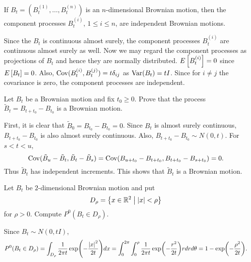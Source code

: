 \begin{exercise}{2.11}\label{ex:2.11}
    If $B_t = (B_t^{(1)},\ldots,B_t^{(n)})$ is an $n$-dimensional Brownian motion, 
    then the component processes $B_t^{(i)}$, $1\leq i\leq n$, are 
    independent Brownian motions. 
\end{exercise}
\begin{solution}
    Since the $B_t$ is continuous almost surely, the component processes 
    $B_t^{(i)}$ are continuous almost surely as well. Now we may regard 
    the component processes as projections of $B_t$ and hence they are 
    normally distributed. $E\left[ {B_t^{(i)}} \right] = 0$ since $E\left[ {B_t} \right] = 0$. 
    Also, $\operatorname{Cov}(B_t^{(i)}, B_t^{(j)}) = t\delta_{ij}$ as $\operatorname{Var}(B_t) = tI$. 
    Since for $i\neq j$ the covariance is zero, the component processes 
    are independent. 
\end{solution}

\begin{exercise}{2.12}\label{ex:2.12}
    Let $B_t$ be a Brownian motion and fix $t_0\geq 0$. Prove that the process 
    $\tilde{B}_t = B_{t+t_0} - B_{t_0}$ is a Brownian motion. 
\end{exercise}
\begin{solution}
    First, it is clear that $\tilde{B}_0 = B_{t_0}-B_{t_0} = 0$. Since $B_t$ 
    is almost surely continuous, $B_{t+t_0} - B_{t_0}$ is also almost surely 
    continuous. Also, $B_{t+t_0} - B_{t_0}\sim N(0, t)$. For 
    $s<t<u$, 
    \begin{equation*}
        \operatorname{Cov}(\tilde{B}_u - \tilde{B}_t, \tilde{B}_t - \tilde{B}_s) 
        = \operatorname{Cov}(B_{u+t_0}-B_{t+t_0}, B_{t+t_0}-B_{s+t_0}) = 0. 
    \end{equation*}
    Thus $\tilde{B}_t$ has independent increments. This shows that 
    $\tilde{B}_t$ is a Brownian motion.
\end{solution}

\begin{exercise}{2.13}\label{ex:2.13}
    Let $B_t$ be $2$-dimensional Brownian motion and put 
    \begin{equation*}
        D_\rho = \left\{ x\in\mathbb{R}^2 \;\middle\vert\; \left\lvert {x} \right\rvert<\rho \right\}
    \end{equation*}
    for $\rho > 0$. Compute $P^0(B_t\in D_\rho)$. 
\end{exercise}
\begin{solution}
    Since $B_t\sim N(0, tI)$, 
    \begin{equation*}
        P^0(B_t\in D_\rho) = \int_{D_\rho} \frac{1}{2\pi t}\exp\pth{-\frac{\abs{x}^2}{2t}}dx 
        = \int_0^{2\pi}\int_0^\rho \frac{1}{2\pi t}\exp\pth{-\frac{r^2}{2t}}rdrd\theta 
        = 1 - \exp\pth{-\frac{\rho^2}{2t}}.
    \end{equation*}
\end{solution}

